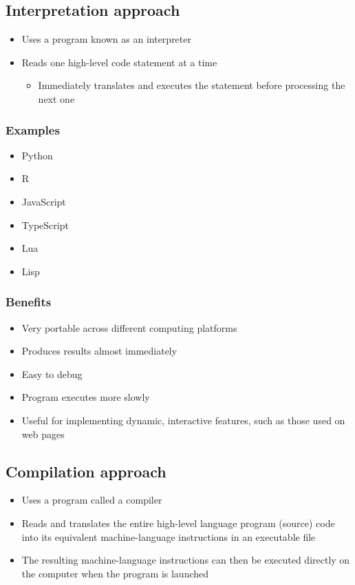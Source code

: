 \documentclass[11pt]{article}
\begin{document}
\subsection{Interpretation approach}
\label{sec:org706c763}
\begin{itemize}
\item Uses a program known as an interpreter
\item Reads one high-level code statement at a time
\begin{itemize}
\item Immediately translates and executes the statement before processing the next one
\end{itemize}
\end{itemize}

\subsubsection{Examples}
\label{sec:org9300115}
\begin{itemize}
\item Python
\item R
\item JavaScript
\item TypeScript
\item Lua
\item Lisp
\end{itemize}

\subsubsection{Benefits}
\label{sec:org12790c6}
\begin{itemize}
\item Very portable across different computing platforms
\item Produces results almost immediately
\item Easy to debug
\item Program executes more slowly
\item Useful for implementing dynamic, interactive features, such as those used on web pages
\end{itemize}

 \newpage

\subsection{Compilation approach}
\label{sec:org64e5c37}
\begin{itemize}
\item Uses a program called a compiler
\item Reads and translates the entire high-level language program (source) code into its equivalent machine-language instructions in an executable file
\item The resulting machine-language instructions can then be executed directly on the computer when the program is launched
\end{itemize}
\end{document}

